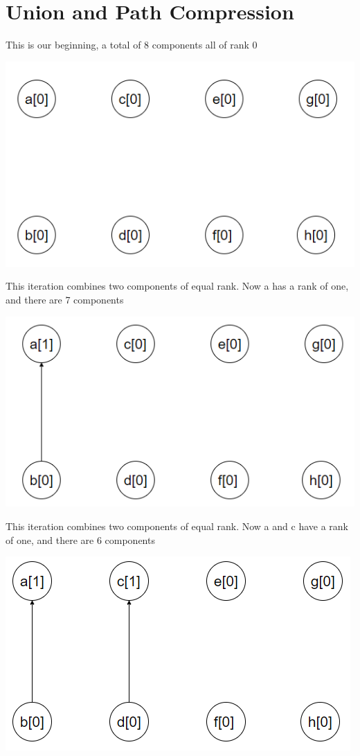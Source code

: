 \documentclass[10pt,a4paper]{article}
\begin{document}
\section{Union and Path Compression}
This is our beginning, a total of 8 components all of rank 0

	\includegraphics[scale = .5]{boi1.PNG}

This iteration combines two components of equal rank. Now a has a rank of one, and there are 7 components 

	\includegraphics[scale = .5]{boi2.PNG}

This iteration combines two components of equal rank. Now a and c have a rank of one, and there are 6 components 

	\includegraphics[scale = .5]{boi3.PNG}
\end{document}
